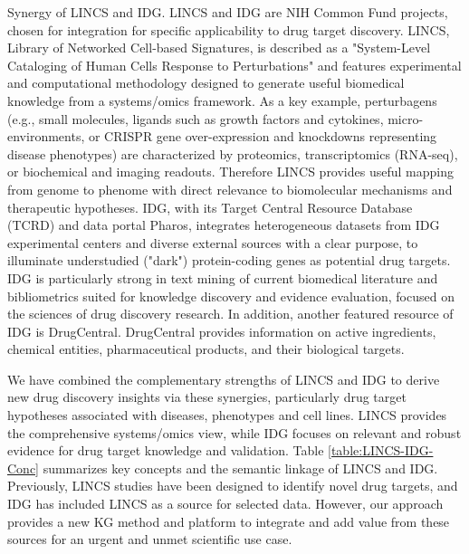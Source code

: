 Synergy of LINCS and IDG. LINCS and IDG are NIH Common Fund\cite{National_Institutes_of_Health_US_Department_of_Health_and_Human_Services_undated-jt} projects, chosen for integration for specific applicability to drug target discovery. LINCS, Library of Networked Cell-based Signatures, is described as a "System-Level Cataloging of Human Cells Response to Perturbations"\cite{Keenan2018-sf} and features experimental and computational methodology designed to generate useful biomedical knowledge from a systems/omics framework. As a key example, perturbagens (e.g., small molecules, ligands such as growth factors and cytokines, micro-environments, or CRISPR gene over-expression and knockdowns representing disease phenotypes) are characterized by proteomics, transcriptomics (RNA-seq), or biochemical and imaging readouts. Therefore LINCS provides useful mapping from genome to phenome with direct relevance to biomolecular mechanisms and therapeutic hypotheses. IDG\cite{Oprea2018-cp}, with its Target Central Resource Database (TCRD) and data portal Pharos\cite{Nguyen2017-lo}, integrates heterogeneous datasets from IDG experimental centers and diverse external sources with a clear purpose, to illuminate understudied ("dark") protein-coding genes as potential drug targets. IDG is particularly strong in text mining of current biomedical literature and bibliometrics suited for knowledge discovery and evidence evaluation, focused on the sciences of drug discovery research. In addition, another featured resource of IDG is DrugCentral\cite{Avram2021-wd}. DrugCentral provides information on active ingredients, chemical entities, pharmaceutical products, and their biological targets.

We have combined the complementary strengths of LINCS and IDG to derive new drug discovery insights via these synergies, particularly drug target hypotheses associated with diseases, phenotypes and cell lines. LINCS provides the comprehensive systems/omics view, while IDG focuses on relevant and robust evidence for drug target knowledge and validation. Table \ref{table:LINCS-IDG-Conc} summarizes key concepts and the semantic linkage of LINCS and IDG. Previously, LINCS studies have been designed to identify novel drug targets\cite{Chen2017-zj}, and IDG has included LINCS as a source for selected data\cite{Ursu2018-sc}. However, our approach provides a new KG method and platform to integrate and add value from these sources for an urgent and unmet scientific use case.

